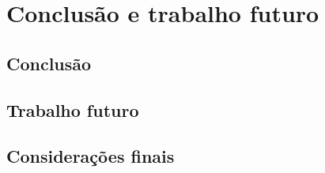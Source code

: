 \chapter{Conclusão e trabalho futuro}


\section{Conclusão}

\section{Trabalho futuro}

\section{Considerações finais}